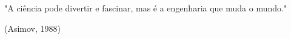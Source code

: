 \thispagestyle{empty}

\begin{minipage}{1cm}

\end{minipage}

\vfill

\begin{center}
\begin{minipage}{11cm}
"A ciência pode divertir e fascinar, mas é a engenharia que muda o mundo."
\end{minipage}
\end{center}

\vspace{1.5cm}

\begin{flushright}
(Asimov, 1988)
\end{flushright}